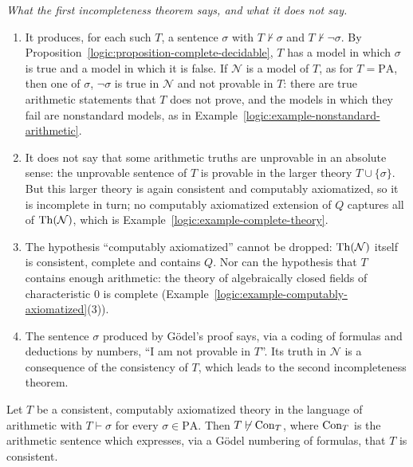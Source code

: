 \begin{remark}\label{logic:remark-reading-incompleteness}
\emph{What the first incompleteness theorem says, and what it does not say.}
\begin{enumerate}
\item It produces, for each such $T$, a sentence $\sigma$ with $T \not\vdash \sigma$ and $T \not\vdash \neg\sigma$. By Proposition~\ref{logic:proposition-complete-decidable}, $T$ has a model in which
$\sigma$ is true and a model in which it is false. If $\mathcal{N}$ is a model of $T$, as for $T = \mathrm{PA}$, then one of $\sigma$, $\neg\sigma$ is true in $\mathcal{N}$ and not provable in $T$:
there are true arithmetic statements that $T$ does not prove, and the models in which they fail are nonstandard models, as in Example~\ref{logic:example-nonstandard-arithmetic}.
\item It does not say that some arithmetic truths are unprovable in an absolute sense: the unprovable sentence of $T$ is provable in the larger theory $T \cup \{\sigma\}$. But this
larger theory is again consistent and computably axiomatized, so it is incomplete in turn; no computably axiomatized extension of $Q$ captures all of $\operatorname{Th}(\mathcal{N})$, which is
Example~\ref{logic:example-complete-theory}.
\item The hypothesis ``computably axiomatized'' cannot be dropped: $\operatorname{Th}(\mathcal{N})$ itself is consistent, complete and contains $Q$. Nor can the hypothesis that $T$ contains
enough arithmetic: the theory of algebraically closed fields of characteristic $0$ is complete (Example~\ref{logic:example-computably-axiomatized}(3)).
\item The sentence $\sigma$ produced by G\"odel's proof says, via a coding of formulas and deductions by numbers, ``I am not provable in $T$''. Its truth in $\mathcal{N}$ is a
consequence of the consistency of $T$, which leads to the second incompleteness theorem.
\end{enumerate}
\end{remark}

\begin{theorem}\label{logic:theorem-second-incompleteness}
Let $T$ be a consistent, computably axiomatized theory in the language of
arithmetic with $T \vdash \sigma$ for every $\sigma \in \mathrm{PA}$. Then
$T \not\vdash \operatorname{Con}_T$, where $\operatorname{Con}_T$ is the arithmetic sentence which
expresses, via a G\"odel numbering of formulas, that $T$ is consistent.
\end{theorem}

